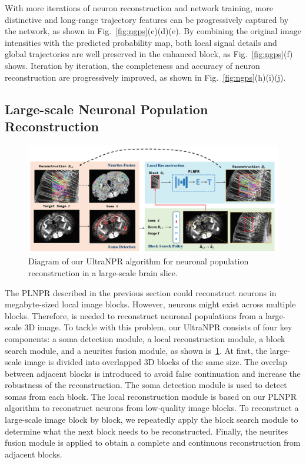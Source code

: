 With more iterations of neuron reconstruction and network training, more distinctive and long-range trajectory features can be progressively captured by the network, as shown in Fig.~\ref{fig:ngps}(c)(d)(e).
By combining the original image intensities with the predicted probability map, both local signal details and global trajectories are well preserved in the enhanced block, as Fig.~\ref{fig:ngps}(f) shows.
Iteration by iteration, the completeness and accuracy of neuron reconstruction are progressively improved, as shown in Fig.~\ref{fig:ngps}(h)(i)(j).




\subsection{Large-scale Neuronal Population Reconstruction}
\label{sec:UltraNPR}

\begin{figure}[th]
	\centering
	\includegraphics[width=1\textwidth]{./Illustrations/framework_ultranpr.PNG}
	\caption{Diagram of our UltraNPR algorithm for neuronal population reconstruction in a large-scale brain slice.}
	\label{fig:ultra_framework}
\end{figure}

The PLNPR described in the previous section could reconstruct neurons in megabyte-sized local image blocks. However, neurons might exist across multiple blocks. Therefore,  is needed to reconstruct neuronal populations from a large-scale 3D image. 
%
To tackle with this problem, our UltraNPR consists of four key components: a soma detection module, a local reconstruction module, a block search module, and a neurites fusion module, as shown is~\ref{fig:ultra_framework}.
At first, the large-scale image is divided into overlapped 3D blocks of the same size. 
The overlap between adjacent blocks is introduced to avoid false continuation and increase the robustness of the reconstruction.
The soma detection module is used to detect somas from each block.
The local reconstruction module is based on our PLNPR algorithm to reconstruct neurons from low-quality image blocks.
To reconstruct a large-scale image block by block,  we repeatedly apply the block search module to determine what the next block needs to be reconstructed. 
Finally, the neurites fusion module is applied to obtain a complete and continuous reconstruction from adjacent blocks.

